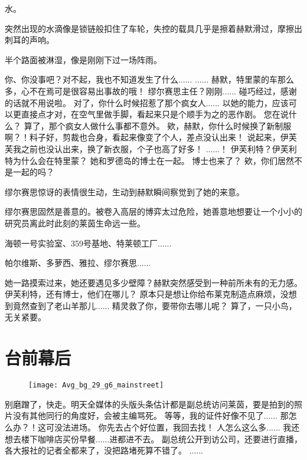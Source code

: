 \documentclass[openany]{book}
\begin{document}
水。\par
突然出现的水滴像是锁链般扣住了车轮，失控的载具几乎是擦着赫默滑过，摩擦出刺耳的声响。\par
半个路面被淋湿，像是刚刚下过一场阵雨。

\begin{dialogue}
     你、你没事吧？对不起，我也不知道发生了什么......
     ......
     赫默，特里蒙的车那么多，心不在焉可是很容易出事故的哦！
     缪尔赛思主任？刚刚......
     碰巧经过，感谢的话就不用说啦。
     对了，你什么时候招惹了那个疯女人......
     以她的能力，应该可以更直接点才对，在空气里做手脚，看起来只是个顺手为之的恶作剧。
     您在说什么？
     算了，那个疯女人做什么事都不意外。
     欸，赫默，你什么时候换了新制服啊？！料子好，剪裁也合身，看起来像变了个人，差点没认出来！
     说起来，伊芙芙我之前也没认出来，换了新衣服，个子也高了好多！
     ......！
     伊芙利特？伊芙利特为什么会在特里蒙？
     她和罗德岛的博士在一起。
     博士也来了？
     欸，你们居然不是一起的吗？\par
    缪尔赛思惊讶的表情很生动，生动到赫默瞬间察觉到了她的来意。\par
    缪尔赛思固然是善意的。被卷入高层的博弈太过危险，她善意地想要让一个小小的研究员离此时此刻的莱茵生命远一些。\par
    海顿一号实验室、359号基地、特莱顿工厂......\par
    帕尔维斯、多萝西、雅拉、缪尔赛思......\par
    她一路摸索过来，她还要遇见多少壁障？赫默突然感受到一种前所未有的无力感。
     伊芙利特，还有博士，他们在哪儿？
     原本只是想让你给布莱克制造点麻烦，没想到竟然查到了老山羊那儿......
     精灵救了你，要带你去哪儿呢？
     算了，一只小鸟，无关紧要。
\end{dialogue}

\chapter{台前幕后}
\begin{figure}[h]
    \centering
    \texttt{[image: Avg\_bg\_29\_g6\_mainstreet]}
\end{figure}
\begin{dialogue}
     别磨蹭了，快走。明天全媒体的头版头条估计都是副总统访问莱茵，要是拍到的照片没有其他同行的角度好，会被主编骂死。
     等等，我的证件好像不见了......
     那怎么办？！这可没法进场。
     你先去占个好位置，我回去找！
     人怎么这么多......
     我还想去楼下咖啡店买份早餐......进都进不去。
     副总统公开到访公司，还要进行直播，各大报社的记者全都来了，没把路堵死算不错了。
     ......
\end{dialogue}
\end{document}
